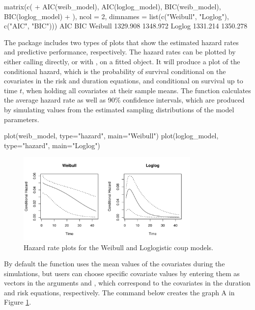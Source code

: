 \begin{example}
  matrix(c(
  +    AIC(weib_model), AIC(loglog_model), BIC(weib_model), BIC(loglog_model)
  +    ), ncol = 2, dimnames = list(c("Weibull", "Loglog"), c("AIC", "BIC")))
               AIC      BIC
  Weibull 1329.908 1348.972
  Loglog  1331.214 1350.278
\end{example}

The package includes two types of plots that show the estimated hazard rates and 
predictive performance, respectively. The hazard rates can be plotted by either 
calling  directly, or with , on
a fitted  object. It will produce a plot of the conditional hazard, which is the probability of survival conditional on the covariates in the risk and
duration equations, and conditional on survival up to time \(t\), when holding
all covariates at their sample means. The
function calculates the average hazard rate as well as 90\% confidence
intervals, which are produced by simulating values from the estimated
sampling distributions of the model parameters. 

\begin{example}
  plot(weib_model,   type="hazard", main="Weibull")
  plot(loglog_model, type="hazard", main="Loglog")
\end{example}

\begin{figure}
\begin{center}
\includegraphics[width=0.8\textwidth]{graphics/hazard-rates.pdf}
\caption{Hazard rate plots for the Weibull and Loglogistic coup models.}
\label{hazard-ex}
\end{center}
\end{figure}

By default the  function
uses the mean values of the covariates during the simulations, but users
can choose specific covariate values by entering them as vectors in the
arguments  and , which correspond to the
covariates in the duration and risk equations, respectively. The command
below creates the graph A in Figure \ref{hazard-ex}.

